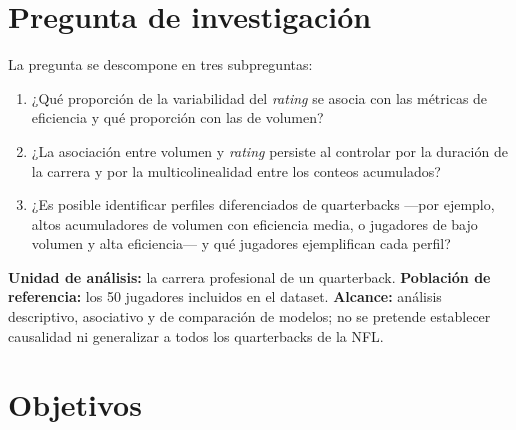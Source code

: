 \documentclass[11pt,a4paper]{article}
\begin{document}
\section{Pregunta de investigación}
\begin{center}
\end{center}

La pregunta se descompone en tres subpreguntas:

\begin{enumerate}
  \item ¿Qué proporción de la variabilidad del \textit{rating} se asocia con las métricas de eficiencia y qué proporción con las de volumen?
  \item ¿La asociación entre volumen y \textit{rating} persiste al controlar por la duración de la carrera y por la multicolinealidad entre los conteos acumulados?
  \item ¿Es posible identificar perfiles diferenciados de quarterbacks —por ejemplo, altos acumuladores de volumen con eficiencia media, o jugadores de bajo volumen y alta eficiencia— y qué jugadores ejemplifican cada perfil?
\end{enumerate}

\textbf{Unidad de análisis:} la carrera profesional de un quarterback. \textbf{Población de referencia:} los 50 jugadores incluidos en el dataset. \textbf{Alcance:} análisis descriptivo, asociativo y de comparación de modelos; no se pretende establecer causalidad ni generalizar a todos los quarterbacks de la NFL.

\section{Objetivos}
\end{document}
